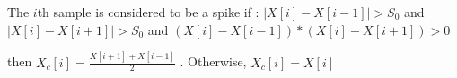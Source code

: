 The $i$th sample is considered to be a spike if :\newline
$|X[i] - X[i-1]| > S_0$ and $|X[i] - X[i+1]| > S_0$  and $ (X[i] - X[i - 1]) * (X[i] - X[i + 1]) > 0$ 

then $X_c[i] = \frac{X[i+1] + X[i-1]}{2}$ . Otherwise, $X_c[i] = X[i]$
